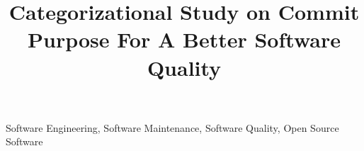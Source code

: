 \documentclass[10pt,conference]{IEEEtran}
\begin{document}
\title{Categorizational Study on Commit Purpose For A Better Software Quality}

\author{
}

\maketitle

\begin{abstract}

\end{abstract}

\begin{IEEEkeywords}
Software Engineering, Software Maintenance, Software Quality, Open Source Software
\end{IEEEkeywords}














\medskip



\vspace{12pt}
\color{red}
\end{document}
